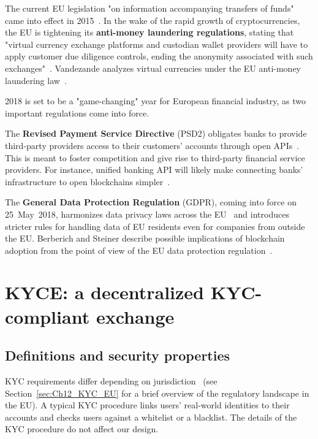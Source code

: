 The current EU legislation "on information accompanying transfers of funds" came into effect in 2015~\cite{EU847}.
In the wake of the rapid growth of cryptocurrencies, the EU is tightening its \textbf{anti-money laundering regulations}, stating that "virtual currency exchange platforms and custodian wallet providers will have to apply customer due diligence controls, ending the anonymity associated with such exchanges"~\cite{EU16}.
Vandezande analyzes virtual currencies under the EU anti-money laundering law~\cite{Vandezande2017}.

2018 is set to be a "game-changing" year for European financial industry, as two important regulations come into force.

The \textbf{Revised Payment Service Directive} (PSD2) obligates banks to provide third-party providers access to their customers' accounts through open APIs~\cite{Hellstroem2017}.
This is meant to foster competition and give rise to third-party financial service providers.
For instance, unified banking API will likely make connecting banks' infrastructure to open blockchains simpler~\cite{Elison2016}.

The \textbf{General Data Protection Regulation} (GDPR), coming into force on 25~May~2018, harmonizes data privacy laws across the EU~\cite{GDPR16} and introduces stricter rules for handling data of EU residents even for companies from outside the EU.
Berberich and Steiner describe possible implications of blockchain adoption from the point of view of the EU data protection regulation~\cite{Berberich2016}.



\section{KYCE: a decentralized KYC-compliant exchange}

\subsection{Definitions and security properties}

KYC requirements differ depending on jurisdiction~\cite{PWC2015} (see Section~\ref{sec:Ch12_KYC_EU} for a brief overview of the regulatory landscape in the EU).
A typical KYC procedure links users' real-world identities to their accounts and checks users against a whitelist or a blacklist.
The details of the KYC procedure do not affect our design.

